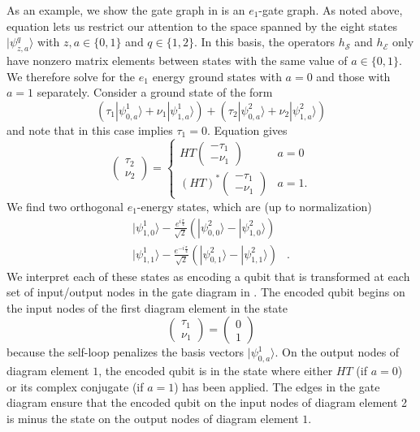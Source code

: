 \documentclass[../thesis-main/thesis-main]{subfiles}
\begin{document}
\begin{example}\label{ex:As-an-example}
As an example, we show the gate graph in  is an $e_{1}$-gate graph. As noted above, equation  lets us restrict our attention to the space spanned by the eight states $|\psi_{z,a}^{q}\rangle$ with $z,a\in \{0,1\}$ and $q\in \{1,2\}$. In this basis, the operators $h_{\mathcal{S}}$ and $h_{\mathcal{E}}$ only have nonzero matrix elements between states with the same value of $a\in\{0,1\}$. We therefore solve for the $e_{1}$ energy ground states with $a=0$ and those with $a=1$ separately. Consider a ground state of the form
\[
\left(\tau_{1}|\psi_{0,a}^{1}\rangle+\nu_{1}|\psi_{1,a}^{1}\rangle\right)+\left(\tau_{2}|\psi_{0,a}^{2}\rangle+\nu_{2}|\psi_{1,a}^{2}\rangle\right)
\]
and note that in this case  implies $\tau_{1}=0$. Equation  gives
\[
\begin{pmatrix}
\tau_{2}\\
\nu_{2}
\end{pmatrix}=\begin{cases}
HT\begin{pmatrix}
-\tau_{1}\\
-\nu_{1}
\end{pmatrix} & a=0\\
(HT)^{*}\begin{pmatrix}
-\tau_{1}\\
-\nu_{1}
\end{pmatrix} & a=1.
\end{cases}
\]
We find two orthogonal $e_{1}$-energy states, which are (up to normalization)
\begin{align}
|\psi_{1,0}^{1}\rangle-\frac{e^{i\frac{\pi}{4}}}{\sqrt{2}}\left(|\psi_{0,0}^{2}\rangle-|\psi_{1,0}^{2}\rangle\right)\label{eq:example_ffstate_1}\\
|\psi_{1,1}^{1}\rangle-\frac{e^{-i\frac{\pi}{4}}}{\sqrt{2}}\left(|\psi_{0,1}^{2}\rangle-|\psi_{1,1}^{2}\rangle\right) & .\label{eq:example_ffstate_2}
\end{align}
We interpret each of these states as encoding a qubit that is transformed at each set of input/output nodes in the gate diagram in . The encoded qubit begins on the input nodes of the first diagram element in the state 
\[
\begin{pmatrix}
\tau_{1}\\
\nu_{1}
\end{pmatrix}=\begin{pmatrix}
0\\
1
\end{pmatrix}
\]
because the self-loop penalizes the basis vectors $|\psi_{0,a}^{1}\rangle$. On the output nodes of diagram element $1$, the encoded qubit is in the state where either $HT$ (if $a=0$) or its complex conjugate (if $a=1$) has been applied. The edges in the gate diagram ensure that the encoded qubit on the input nodes of diagram element 2 is minus the state on the output nodes of diagram element $1$.
\end{example}
\end{document}
